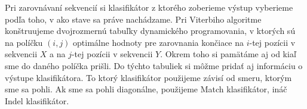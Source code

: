


Pri zarovnávaní sekvencií si klasifikátor z ktorého zoberieme výstup vyberieme podľa toho, v ako stave sa práve nachádzame. Pri Viterbiho algoritme konštruujeme dvojrozmernú tabuľky dynamického programovania, v ktorých sú na políčku $(i, j)$ optimálne hodnoty pre zarovnania končiace na $i$-tej pozícii v sekvencii $X$ a na $j$-tej pozícii v sekvencii $Y$. Okrem toho si pamätáme aj od kiaľ sme do daného políčka prišli. Do týchto tabuliek si môžme pridať aj informáciu o výstupe klasifikátora. To ktorý klasifikátor použijeme závisí od smeru, ktorým sme sa pohli. Ak sme sa pohli diagonálne, použijeme Match klasifikátor, ináč Indel klasifikátor.


